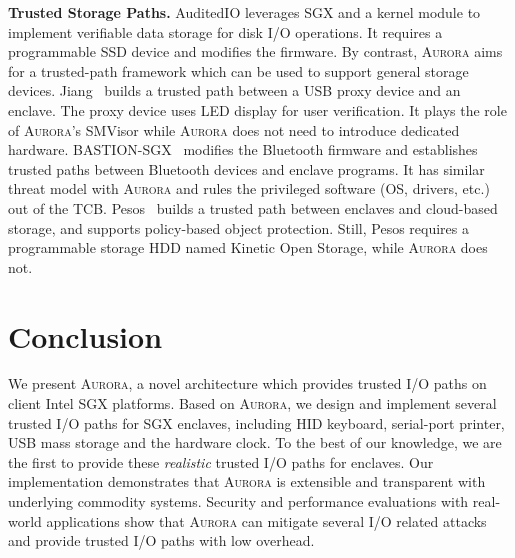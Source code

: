 \textbf{Trusted Storage Paths.}
AuditedIO \cite{DBLP:conf/apsys/BalakrishnanCBS17} leverages SGX and a kernel module to implement verifiable data storage for disk I/O operations. It requires a programmable SSD device and modifies the firmware.
By contrast, \textsc{Aurora} aims for a trusted-path framework which can be used to support general storage devices. %
Jiang~\cite{Jang2017Building} builds a trusted path between a USB proxy device and an enclave. The proxy device uses LED display for user verification. It plays the role of  \textsc{Aurora}'s SMVisor while \textsc{Aurora} does not need to introduce dedicated hardware. %
BASTION-SGX~\cite{DBLP:conf/isca/PetersLVPK18} modifies the Bluetooth firmware and establishes trusted paths between Bluetooth  devices and enclave programs. It has similar threat model with \textsc{Aurora} and rules the privileged software (OS, drivers, etc.) out of the TCB. %
Pesos~\cite{DBLP:conf/eurosys/KrahnTVKBF18} builds a trusted path between enclaves and cloud-based storage, and supports policy-based object protection. Still, Pesos requires a programmable storage HDD named Kinetic Open Storage, while \textsc{Aurora} does not.


\section{Conclusion}

We present \textsc{Aurora}, a novel architecture which provides trusted I/O paths on client Intel SGX platforms. Based on \textsc{Aurora}, we design and implement several trusted I/O paths for SGX enclaves, including HID keyboard, serial-port printer, USB mass storage and the hardware clock. To the best of our knowledge, we are the first to provide these \emph{realistic} trusted I/O paths for enclaves. Our implementation demonstrates that \textsc{Aurora} is extensible and transparent with underlying commodity systems. Security and performance evaluations with real-world applications show that \textsc{Aurora} can mitigate several I/O related attacks and provide trusted I/O paths with low overhead.


